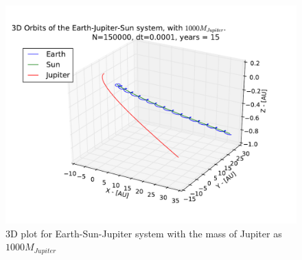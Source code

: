 \documentclass[12pt]{article}
\begin{document}
\begin{figure}[!h]
\centering
\includegraphics[width=\linewidth]{Plots/Earth_Sun_Jupiter_1000MJ_3D.pdf}
\caption{3D plot for Earth-Sun-Jupiter system with the mass of Jupiter as $1000M_{Jupiter}$}
\label{fig:Appendix_1000MJ}
\end{figure}
\end{document}
